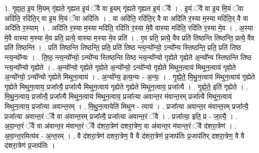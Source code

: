 \documentclass[17pt]{extarticle}
\begin{document}
1. गृ॒ह्य॒त॒ इ॒य मि॒यम् गृ॑ह्यते गृह्यत इ॒यं ॅवै वा इ॒यम् गृ॑ह्यते गृह्यत इ॒यं ॅवै । . इ॒यं ॅवै वा इ॒य मि॒यं ॅवा अदि॑ति॒ रदि॑ति॒र् वा इ॒य मि॒यं ॅवा अदि॑तिः । . वा अदि॑ति॒ रदि॑ति॒र् वै वा अदि॑ति र॒स्या म॒स्या मदि॑ति॒र् वै वा अदि॑ति र॒स्याम् । . अदि॑ति र॒स्या म॒स्या मदि॑ति॒ रदि॑ति र॒स्या मे॒वै वास्या मदि॑ति॒ रदि॑ति र॒स्या मे॒व । . अ॒स्या मे॒वै वास्या म॒स्या मे॒व प्रति॒ प्रत्ये॒ वास्या म॒स्या मे॒व प्रति॑ । . ए॒व प्रति॒ प्रत्ये॒ वैव प्रति॑ तिष्ठन्ति तिष्ठन्ति॒ प्रत्ये॒ वैव प्रति॑ तिष्ठन्ति । . प्रति॑ तिष्ठन्ति तिष्ठन्ति॒ प्रति॒ प्रति॑ तिष्ठ न्त्य॒न्यो᳚न्यो॒ ऽन्यो᳚न्य स्तिष्ठन्ति॒ प्रति॒ प्रति॑ तिष्ठ न्त्य॒न्यो᳚न्यः । . ति॒ष्ठ॒ न्त्य॒न्यो᳚न्यो॒ ऽन्यो᳚न्य स्तिष्ठन्ति तिष्ठ न्त्य॒न्यो᳚न्यो गृह्येते गृह्येते अ॒न्यो᳚न्य स्तिष्ठन्ति तिष्ठ न्त्य॒न्यो᳚न्यो गृह्येते । . अ॒न्यो᳚न्यो गृह्येते गृह्येते अ॒न्यो᳚न्यो॒ ऽन्यो᳚न्यो गृह्येते मिथुन॒त्वाय॑ मिथुन॒त्वाय॑ गृह्येते अ॒न्यो᳚न्यो॒ ऽन्यो᳚न्यो गृह्येते मिथुन॒त्वाय॑ । . अ॒न्यो᳚न्य॒ इत्य॒न्यः - अ॒न्यः॒ । . गृ॒ह्ये॒ते॒ मि॒थु॒न॒त्वाय॑ मिथुन॒त्वाय॑ गृह्येते गृह्येते मिथुन॒त्वाय॒ प्रजा᳚त्यै॒ प्रजा᳚त्यै मिथुन॒त्वाय॑ गृह्येते गृह्येते मिथुन॒त्वाय॒ प्रजा᳚त्यै । . गृ॒ह्ये॒ते॒ इति॑ गृह्येते । . मि॒थु॒न॒त्वाय॒ प्रजा᳚त्यै॒ प्रजा᳚त्यै मिथुन॒त्वाय॑ मिथुन॒त्वाय॒ प्रजा᳚त्या अवान्त॒र म॑वान्त॒रम् प्रजा᳚त्यै मिथुन॒त्वाय॑ मिथुन॒त्वाय॒ प्रजा᳚त्या अवान्त॒रम् । . मि॒थु॒न॒त्वायेति॑ मिथुन - त्वाय॑ । . प्रजा᳚त्या अवान्त॒र म॑वान्त॒रम् प्रजा᳚त्यै॒ प्रजा᳚त्या अवान्त॒रं ॅवै वा अ॑वान्त॒रम् प्रजा᳚त्यै॒ प्रजा᳚त्या अवान्त॒रं ॅवै । . प्रजा᳚त्या॒ इति॒ प्र - जा॒त्यै॒ । . अ॒वा॒न्त॒रं ॅवै वा अ॑वान्त॒र म॑वान्त॒रं ॅवै द॑शरा॒त्रेण॑ दशरा॒त्रेण॒ वा अ॑वान्त॒र म॑वान्त॒रं ॅवै द॑शरा॒त्रेण॑ । . अ॒वा॒न्त॒रमित्य॑व - अ॒न्त॒रम् । . वै द॑शरा॒त्रेण॑ दशरा॒त्रेण॒ वै वै द॑शरा॒त्रेण॑ प्र॒जाप॑तिः प्र॒जाप॑तिर् दशरा॒त्रेण॒ वै वै द॑शरा॒त्रेण॑ प्र॒जाप॑तिः । \newline
\end{document}
